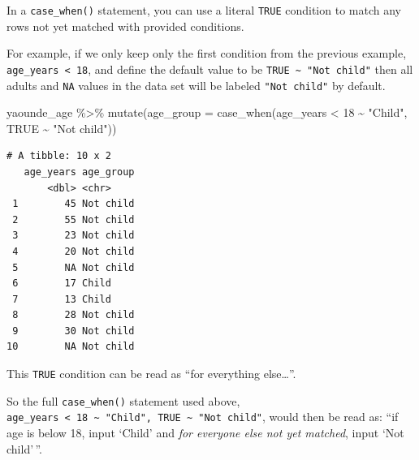 \documentclass[
  letterpaper,
  DIV=11,
  numbers=noendperiod]{scrreprt}
\newenvironment{Shaded}{\begin{snugshade}}{\end{snugshade}}
\newcommand{\AttributeTok}[1]{\textcolor[rgb]{0.40,0.45,0.13}{#1}}
\newcommand{\ConstantTok}[1]{\textcolor[rgb]{0.56,0.35,0.01}{#1}}
\newcommand{\DecValTok}[1]{\textcolor[rgb]{0.68,0.00,0.00}{#1}}
\newcommand{\FunctionTok}[1]{\textcolor[rgb]{0.28,0.35,0.67}{#1}}
\newcommand{\NormalTok}[1]{\textcolor[rgb]{0.00,0.23,0.31}{#1}}
\newcommand{\SpecialCharTok}[1]{\textcolor[rgb]{0.37,0.37,0.37}{#1}}
\newcommand{\StringTok}[1]{\textcolor[rgb]{0.13,0.47,0.30}{#1}}
\begin{document}
In a \texttt{case\_when()} statement, you can use a literal
\texttt{TRUE} condition to match any rows not yet matched with provided
conditions.

For example, if we only keep only the first condition from the previous
example, \texttt{age\_years\ \textless{}\ 18}, and define the default
value to be \texttt{TRUE\ \textasciitilde{}\ "Not\ child"} then all
adults and \texttt{NA} values in the data set will be labeled
\texttt{"Not\ child"} by default.

\begin{Shaded}
\begin{Highlighting}[]
\NormalTok{yaounde\_age }\SpecialCharTok{\%\textgreater{}\%}  
  \FunctionTok{mutate}\NormalTok{(}\AttributeTok{age\_group =} \FunctionTok{case\_when}\NormalTok{(age\_years }\SpecialCharTok{\textless{}} \DecValTok{18} \SpecialCharTok{\textasciitilde{}} \StringTok{"Child"}\NormalTok{,}
                               \ConstantTok{TRUE} \SpecialCharTok{\textasciitilde{}} \StringTok{"Not child"}\NormalTok{))}
\end{Highlighting}
\end{Shaded}

\begin{verbatim}
# A tibble: 10 x 2
   age_years age_group
       <dbl> <chr>    
 1        45 Not child
 2        55 Not child
 3        23 Not child
 4        20 Not child
 5        NA Not child
 6        17 Child    
 7        13 Child    
 8        28 Not child
 9        30 Not child
10        NA Not child
\end{verbatim}

This \texttt{TRUE} condition can be read as ``for everything
else\ldots{}''.

So the full \texttt{case\_when()} statement used above,
\texttt{age\_years\ \textless{}\ 18\ \textasciitilde{}\ "Child",\ TRUE\ \textasciitilde{}\ "Not\ child"},
would then be read as: ``if age is below 18, input `Child' and \emph{for
everyone else not yet matched}, input `Not child'\,''.
\end{document}
